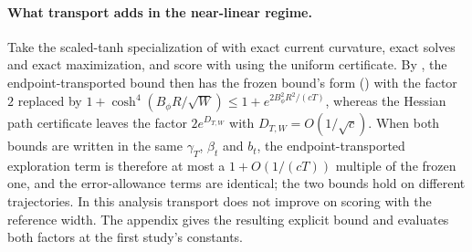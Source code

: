 \paragraph{What transport adds in the near-linear regime.}
Take the scaled-tanh specialization of 
with exact current curvature, exact solves and exact maximization, and score
with  using the uniform certificate. By
, the endpoint-transported bound then has the
frozen bound's form () with the factor $2$
replaced by $1+\cosh^4(B_\phi R/\sqrt W)\le1+e^{2B_\phi^2R^2/(cT)}$, whereas
the Hessian path certificate leaves the factor $2e^{D_{T,W}}$ with
$D_{T,W}=O(1/\sqrt c)$. When both bounds are written in the same $\gamma_T$,
$\beta_t$ and $b_t$, the endpoint-transported exploration term is therefore at
most a $1+O(1/(cT))$ multiple of the frozen one, and the error-allowance
terms are identical; the two bounds hold on different trajectories. In this analysis
transport does not improve on scoring with the reference width. The appendix gives the
resulting explicit bound and evaluates both factors at the first study's
constants.

